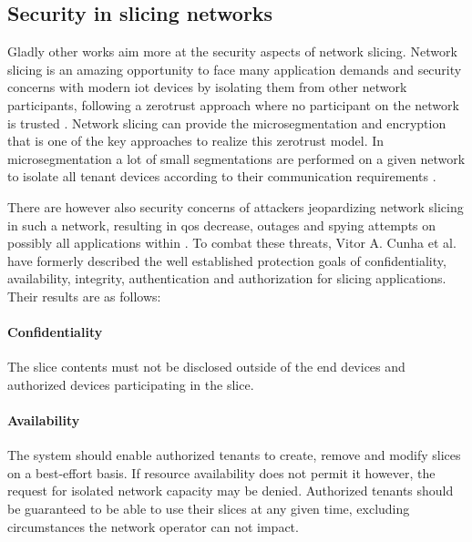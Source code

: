 \subsection{Security in slicing networks}
Gladly other works aim more at the security aspects of network slicing. Network slicing is an amazing opportunity to face many application demands and security concerns with modern \acrshort{iot} devices by isolating them from other network participants, following a \gls{zerotrust} approach where no participant on the network is trusted \cite{zerotrust}. Network slicing can provide the \gls{microsegmentation} and encryption that is one of the key approaches to realize this \gls{zerotrust} model. In \gls{microsegmentation} a lot of small segmentations are performed on a given network to isolate all tenant devices according to their communication requirements \cite{zerotrust}.

There are however also security concerns of attackers jeopardizing network slicing in such a network, resulting in \acrshort{qos} decrease, outages and spying attempts on possibly all applications within \cite{SE1}. To combat these threats, Vitor A. Cunha et al. \cite{SE1} have formerly described the well established protection goals of confidentiality, availability, integrity, authentication and authorization for slicing applications. Their results are as follows:

\paragraph{Confidentiality} The slice contents must not be disclosed outside of the end devices and authorized devices participating in the slice.

\paragraph{Availability} The system should enable authorized tenants to create, remove and modify slices on a best-effort basis. If resource availability does not permit it however, the request for isolated network capacity may be denied. Authorized tenants should be guaranteed to be able to use their slices at any given time, excluding circumstances the network operator can not impact.


